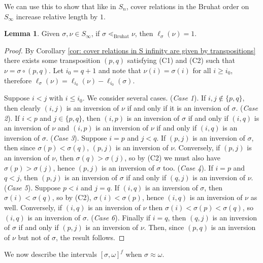 \documentclass[oneside,11pt,reqno]{amsart}
\theoremstyle{definition}
\newtheorem{proof techniques}{Proof Techniques}
\newtheorem{lemma}{Lemma}
\begin{document}
We can use this to show that like in $S_n$, cover relations in the Bruhat order on $S_\infty$ increase relative length by $1$.

\begin{lemma}\label{lem: cover relations increase relative length by one}
    Given $\sigma, \nu \in S_\infty$, if $\sigma \lessdot_\text{Bruhat} \nu$, then $\ell_\sigma(\nu) = 1$.  
\end{lemma}

\begin{proof}
    By Corollary \ref{cor: cover relations in S infinity are given by transpositions} there exists some transposition $(p , q)$ satisfying (C1) and (C2) such that $\nu = \sigma \circ (p , q)$. Let $i_0 = q + 1$ and note that $\nu(i) = \sigma(i)$ for all $i \geq i_0$, therefore $\ell_\sigma(\nu) = \ell_{i_0}(\nu) - \ell_{i_0}(\sigma)$. 

    Suppose $i < j$ with $i \leq i_0$. We consider several cases. (\emph{Case 1}). If $i , j \notin \{ p , q \}$, then clearly $(i , j)$ is an inversion of $\nu$ if and only if it is an inversion of $\sigma$. (\emph{Case 2}). If $i < p$ and $j \in \{ p , q \}$, then $(i , p)$ is an inversion of $\sigma$ if and only if $(i , q)$ is an inversion of $\nu$ and $(i , p)$ is an inversion of $\nu$ if and only if $(i , q)$ is an inversion of $\sigma$. (\emph{Case 3}). Suppose $i = p$ and $j < q$. If $(p , j)$ is an inversion of $\sigma$, then since $\sigma(p) < \sigma(q)$, $(p , j)$ is an inversion of $\nu$. Conversely, if $(p , j)$ is an inversion of $\nu$, then $\sigma(q) > \sigma(j)$, so by (C2) we must also have $\sigma(p) > \sigma(j)$, hence $(p , j)$ is an inversion of $\sigma$ too. (\emph{Case 4}). If $i = p$ and $q < j$, then $(p , j)$ is an inversion of $\sigma$ if and only if $(q , j)$ is an inversion of $\nu$. (\emph{Case 5}). Suppose $p < i$ and $j = q$. If $( i , q)$ is an inversion of $\sigma$, then $\sigma(i) < \sigma(q)$, so by (C2), $\sigma(i) < \sigma(p)$, hence $(i , q)$ is an inversion of $\nu$ as well. Conversely, if $(i , q)$ is an inversion of $\nu$ then $\sigma(i) < \sigma(p) < \sigma(q)$, so $(i , q)$ is an inversion of $\sigma$. (\emph{Case 6}). Finally if $i = q$, then $(q , j)$ is an inversion of $\sigma$ if and only if $(p , j)$ is an inversion of $\nu$. Then, since $(p , q)$ is an inversion of $\nu$ but not of $\sigma$, the result follows.
\end{proof}

We now describe the intervals $[\sigma , \omega]^f$ when $\sigma \approx \omega$. 
\end{document}
